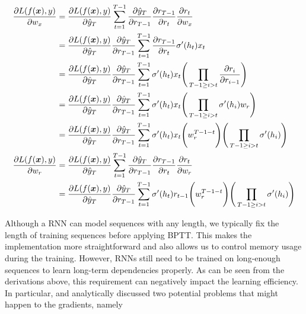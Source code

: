 \begin{align*}
	\frac{\partial L(f(\boldsymbol{x}), y)}{\partial w_x} &= \frac{ \partial L(f(\boldsymbol{x}), y)}{ \partial  \hat{y}_T  } \sum_{t=1} ^{T-1} \frac{ \partial \hat{y}_T}{ \partial  r_{T-1}  } \frac{ \partial r_{T-1}}{ \partial r_t } \frac{ \partial r_t}{ \partial w_x }  \\
&= \frac{ \partial L(f(\boldsymbol{x}), y)}{ \partial  \hat{y}_T  } \frac{ \partial \hat{y}_T}{ \partial  r_{T-1}  }  \sum_{t=1} ^{T-1} \frac{ \partial r_{T-1}}{ \partial r_t }  \sigma'(h_t)x_t  \\
&= \frac{ \partial L(f(\boldsymbol{x}), y)}{ \partial  \hat{y}_T  } \frac{ \partial \hat{y}_T}{ \partial  r_{T-1}  }  \sum_{t=1} ^{T-1} \sigma'(h_t)x_t  \Bigg( \prod_{T-1 \ge i > t} \frac{ \partial r_i}{ \partial r_{i-1} } \Bigg)   \\
&= \frac{ \partial L(f(\boldsymbol{x}), y)}{ \partial  \hat{y}_T  } \frac{ \partial \hat{y}_T}{ \partial  r_{T-1}  }  \sum_{t=1} ^{T-1} \sigma'(h_t)x_t  \Bigg( \prod_{T-1 \ge i > t} \sigma'(h_i) w_r \Bigg)   \\
&= \frac{ \partial L(f(\boldsymbol{x}), y)}{ \partial  \hat{y}_T  } \frac{ \partial \hat{y}_T}{ \partial  r_{T-1}  }  \sum_{t=1} ^{T-1} \sigma'(h_t)x_t \Bigg ( w_r^{T-1-t} \Bigg )\Bigg( \prod_{T-1 \ge i > t} \sigma'(h_i) \Bigg)  \\
\frac{\partial L(f(\boldsymbol{x}), y)}{\partial w_{r}} &= 	 \frac{ \partial L(f(\boldsymbol{x}), y)}{ \partial  \hat{y}_T  } \sum_{t=1} ^{T-1} \frac{ \partial \hat{y}_T}{ \partial  r_{T-1}  } \frac{ \partial r_{T-1}}{ \partial r_t } \frac{ \partial r_t}{ \partial w_r }  \\
	 &= \frac{ \partial L(f(\boldsymbol{x}), y)}{ \partial  \hat{y}_T  } \frac{ \partial \hat{y}_T}{ \partial  r_{T-1}  }  \sum_{t=1} ^{T-1} \sigma'(h_t) r_{t-1} \Bigg( w_r^{T-1-t} \Bigg )\Bigg( \prod_{T-1 \ge i > t} \sigma'(h_i) \Bigg) 
\end{align*}

Although a RNN can model sequences with any length, we typically fix the length of training sequences before applying BPTT. This makes the implementation more straightforward and also allows us to control memory usage during the training. However, RNNs still need to be trained on long-enough sequences to learn long-term dependencies properly. As can be seen from the derivations above, this requirement can negatively impact the learning efficiency. In particular, \citet{BengioLearninglongtermdependencies1994} and \citet{ Pascanudifficultytrainingrecurrent2013} analytically discussed two potential problems that might happen to the gradients, namely

